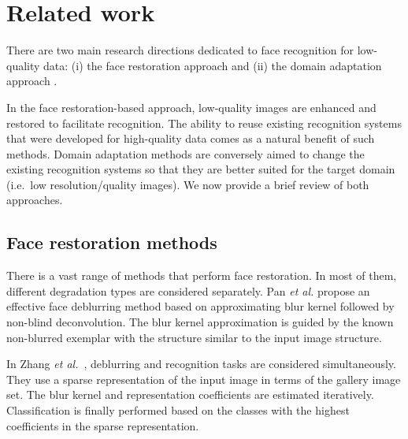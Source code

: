 \section{Related work}
\label{sect:related}

There are two main research directions dedicated to face recognition for low-quality data: (i) the face restoration approach \cite{pan2014deblurring,TuzelTH16,ZhuLLT16,xu2017learning,huang2017wavelet} and (ii) the domain adaptation approach \cite{gong2012geodesic,huang2007correcting,pan2008transfer,pan2011domain,baktashmotlagh2013unsupervised,long2015learning,luo2018deep,Volpi_2018_CVPR,Hong_2018_CVPR,Deng_2018_CVPR,Bousmalis_2017_CVPR,Murez_2018_CVPR,xu2018cross}.

In the face restoration-based approach, low-quality images are enhanced and restored to facilitate recognition. The ability to reuse existing recognition systems that were developed for high-quality data comes as a natural benefit of such methods. Domain adaptation methods are conversely aimed to change the existing recognition systems so that they are better suited for the target domain (i.e.\ low resolution/quality images). We now provide a brief review of both approaches.

\subsection{Face restoration methods}

There is a vast range of methods that perform face restoration. In most of them, different degradation types are considered separately. Pan \textit{et al.} \cite{pan2014deblurring} propose an effective face deblurring method based on approximating blur kernel followed by non-blind deconvolution. The blur kernel  approximation is guided by the known non-blurred exemplar with the structure similar to the input image structure. 

In Zhang \textit{et al.}~\cite{ZhangYZNH11}, deblurring and recognition tasks are considered simultaneously. They use a sparse representation of the input image in terms of the gallery image set. The blur kernel and representation coefficients are estimated iteratively. Classification is finally performed based on the classes with the highest coefficients in the sparse representation.  


